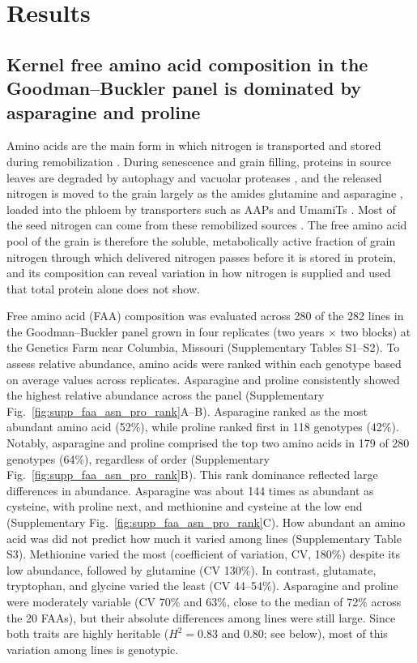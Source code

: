 \section{Results}\label{results}

\subsection{Kernel free amino acid composition in the Goodman--Buckler panel is dominated by asparagine and proline}

Amino acids are the main form in which nitrogen is transported and stored during remobilization \citep{masclaux2010nitrogen, santiago2020amino}. During senescence and grain filling, proteins in source leaves are degraded by autophagy and vacuolar proteases \cite{potter2026chloroplast}, and the released nitrogen is moved to the grain largely as the amides glutamine and asparagine \citep{teixeira2026amino}, loaded into the phloem by transporters such as AAPs and UmamiTs \citep{santiago2020amino}. Most of the seed nitrogen can come from these remobilized sources \citep{masclaux2010nitrogen}. The free amino acid pool of the grain is therefore the soluble, metabolically active fraction of grain nitrogen through which delivered nitrogen passes before it is stored in protein, and its composition can reveal variation in how nitrogen is supplied and used that total protein alone does not show.

Free amino acid (FAA) composition was evaluated across 280 of the 282 lines in the Goodman--Buckler panel grown in four replicates (two years $\times$ two blocks) at the Genetics Farm near Columbia, Missouri (Supplementary Tables S1--S2). To assess relative abundance, amino acids were ranked within each genotype based on average values across replicates. Asparagine and proline consistently showed the highest relative abundance across the panel (Supplementary Fig.~\ref{fig:supp_faa_asn_pro_rank}A--B). Asparagine ranked as the most abundant amino acid (52\%), while proline ranked first in 118 genotypes (42\%). Notably, asparagine and proline comprised the top two amino acids in 179 of 280 genotypes (64\%), regardless of order (Supplementary Fig.~\ref{fig:supp_faa_asn_pro_rank}B). This rank dominance reflected large differences in abundance. Asparagine was about 144 times as abundant as cysteine, with proline next, and methionine and cysteine at the low end (Supplementary Fig.~\ref{fig:supp_faa_asn_pro_rank}C). How abundant an amino acid was did not predict how much it varied among lines (Supplementary Table S3). Methionine varied the most (coefficient of variation, CV, 180\%) despite its low abundance, followed by glutamine (CV 130\%). In contrast, glutamate, tryptophan, and glycine varied the least (CV 44--54\%). Asparagine and proline were moderately variable (CV 70\% and 63\%, close to the median of 72\% across the 20 FAAs), but their absolute differences among lines were still large. Since both traits are highly heritable ($H^2 = 0.83$ and 0.80; see below), most of this variation among lines is genotypic.


